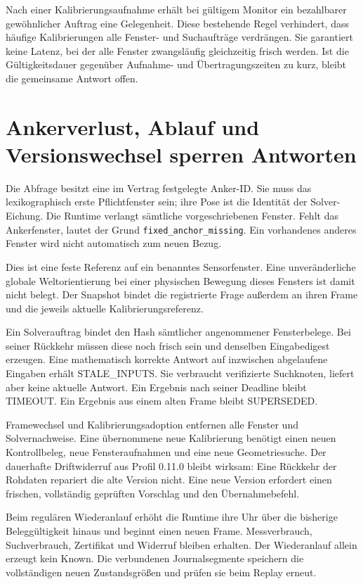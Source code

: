 \documentclass[11pt,a4paper]{article}
\newcommand{\nextsection}[2]{\clearpage{\color{accent}\small\textsf{#1}}\section{#2}}
\begin{document}
Nach einer Kalibrierungsaufnahme erhält bei gültigem Monitor
ein bezahlbarer gewöhnlicher Auftrag eine Gelegenheit. Diese
bestehende Regel verhindert, dass häufige Kalibrierungen alle
Fenster- und Suchaufträge verdrängen. Sie garantiert keine
Latenz, bei der alle Fenster zwangsläufig gleichzeitig frisch
werden. Ist die Gültigkeitsdauer gegenüber Aufnahme- und
Übertragungszeiten zu kurz, bleibt die gemeinsame Antwort offen.

\nextsection{74 / FESTER BEZUG}{Ankerverlust, Ablauf und Versionswechsel sperren Antworten}
Die Abfrage besitzt eine im Vertrag festgelegte Anker-ID.
Sie muss das lexikographisch erste Pflichtfenster sein; ihre
Pose ist die Identität der Solver-Eichung. Die Runtime verlangt
sämtliche vorgeschriebenen Fenster. Fehlt das Ankerfenster,
lautet der Grund \texttt{fixed\_anchor\_missing}. Ein vorhandenes
anderes Fenster wird nicht automatisch zum neuen Bezug.

Dies ist eine feste Referenz auf ein benanntes Sensorfenster.
Eine unveränderliche globale Weltorientierung bei einer
physischen Bewegung dieses Fensters ist damit nicht belegt.
Der Snapshot bindet die registrierte Frage außerdem an ihren
Frame und die jeweils aktuelle Kalibrierungsreferenz.

Ein Solverauftrag bindet den Hash sämtlicher angenommener
Fensterbelege. Bei seiner Rückkehr müssen diese noch frisch
sein und denselben Eingabedigest erzeugen. Eine mathematisch
korrekte Antwort auf inzwischen abgelaufene Eingaben erhält
STALE\_INPUTS. Sie verbraucht verifizierte Suchknoten, liefert
aber keine aktuelle Antwort. Ein Ergebnis nach seiner Deadline
bleibt TIMEOUT. Ein Ergebnis aus einem alten Frame bleibt
SUPERSEDED.

Framewechsel und Kalibrierungsadoption entfernen alle Fenster
und Solvernachweise. Eine übernommene neue Kalibrierung benötigt
einen neuen Kontrollbeleg, neue Fensteraufnahmen und eine neue
Geometriesuche. Der dauerhafte Driftwiderruf aus Profil 0.11.0
bleibt wirksam: Eine Rückkehr der Rohdaten repariert die alte
Version nicht. Eine neue Version erfordert einen frischen,
vollständig geprüften Vorschlag und den Übernahmebefehl.

Beim regulären Wiederanlauf erhöht die Runtime ihre Uhr über
die bisherige Beleggültigkeit hinaus und beginnt einen neuen
Frame. Messverbrauch, Suchverbrauch, Zertifikat und Widerruf
bleiben erhalten. Der Wiederanlauf allein erzeugt kein Known.
Die verbundenen Journalsegmente speichern die vollständigen
neuen Zustandsgrößen und prüfen sie beim Replay erneut.
\end{document}

